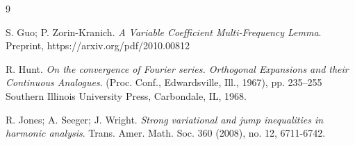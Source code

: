 \documentclass[12pt]{amsart}
\numberwithin{equation}{section}
\theoremstyle{definition}
\begin{document}
\begin{thebibliography}{9}


S. Guo; P. Zorin-Kranich.
\emph{A Variable Coefficient Multi-Frequency Lemma}.
Preprint, https://arxiv.org/pdf/2010.00812







R. Hunt.
\emph{On the convergence of Fourier series. Orthogonal Expansions and their Continuous Analogues}. (Proc. Conf., Edwardsville, Ill., 1967), pp. 235–255
Southern Illinois University Press, Carbondale, IL, 1968.




R. Jones; A. Seeger; J. Wright. \emph{Strong variational and jump inequalities in harmonic analysis}.
Trans. Amer. Math. Soc. 360 (2008), no. 12, 6711-6742.



\end{thebibliography}
\end{document}
